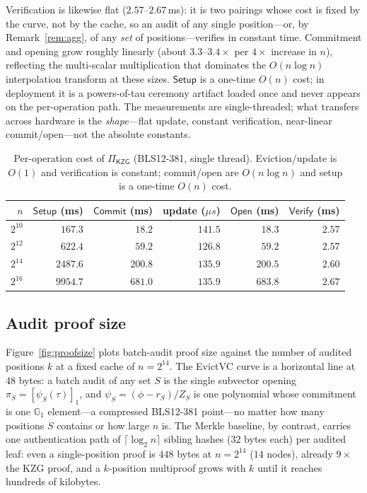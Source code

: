 \documentclass[version=submission]{iacrcc}
\theoremstyle{definition}
\newcommand{\Setup}{\mathsf{Setup}}
\newcommand{\Commit}{\mathsf{Commit}}
\newcommand{\Open}{\mathsf{Open}}
\newcommand{\Vfy}{\mathsf{Verify}}
\newcommand{\GG}{\mathbb{G}}
\newcommand{\gone}[1]{\left[#1\right]_{1}}
\newcommand{\Zpol}{Z}
\newcommand{\rpol}{r}
\begin{document}
Verification is likewise flat ($2.57$--$2.67\,$ms): it is two pairings whose cost
is fixed by the curve, not by the cache, so an audit of any single position---or,
by Remark~\ref{rem:agg}, of any \emph{set} of positions---verifies in constant
time. Commitment and opening grow roughly linearly (about $3.3$--$3.4\times$ per
$4\times$ increase in $n$), reflecting the multi-scalar multiplication that
dominates the $O(n\log n)$ interpolation transform at these sizes. $\Setup$ is a
one-time $O(n)$ cost; in deployment it is a powers-of-tau ceremony artifact loaded
once and never appears on the per-operation path. The measurements are
single-threaded; what transfers across hardware is the \emph{shape}---flat
update, constant verification, near-linear commit/open---not the absolute
constants.

\begin{table}[t]\centering
\renewcommand{\arraystretch}{1.1}
\begin{tabular}{@{}rrrrrr@{}}
\toprule
$n$ & $\Setup$ (ms) & $\Commit$ (ms) & update ($\mu s$) & $\Open$ (ms) & $\Vfy$ (ms)\\
\midrule
$2^{10}$ & $167.3$  & $18.2$  & $141.5$ & $18.3$  & $2.57$\\
$2^{12}$ & $622.4$  & $59.2$  & $126.8$ & $59.2$  & $2.57$\\
$2^{14}$ & $2487.6$ & $200.8$ & $135.9$ & $200.5$ & $2.60$\\
$2^{16}$ & $9954.7$ & $681.0$ & $135.9$ & $683.8$ & $2.67$\\
\bottomrule
\end{tabular}
\caption{Per-operation cost of $\Pi_{\mathsf{KZG}}$ (BLS12-381, single thread).
Eviction/update is $O(1)$ and verification is constant; commit/open are
$O(n\log n)$ and setup is a one-time $O(n)$ cost.}
\label{tab:maint}
\end{table}

\subsection{Audit proof size}
Figure~\ref{fig:proofsize} plots batch-audit proof size against the number of
audited positions $k$ at a fixed cache of $n=2^{14}$. The EvictVC curve is a
horizontal line at $48$ bytes: a batch audit of any set $S$ is the single
subvector opening $\pi_S=\gone{\psi_S(\tau)}$, and
$\psi_S=(\phi-\rpol_S)/\Zpol_S$ is one polynomial whose commitment is one $\GG_1$
element---a compressed BLS12-381 point---no matter how many positions $S$
contains or how large $n$ is. The Merkle baseline, by contrast, carries one
authentication path of $\lceil\log_2 n\rceil$ sibling hashes ($32$ bytes each)
per audited leaf: even a single-position proof is $448$ bytes at $n=2^{14}$
($14$ nodes), already $9\times$ the KZG proof, and a $k$-position multiproof grows
with $k$ until it reaches hundreds of kilobytes.
\end{document}
